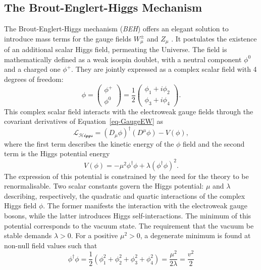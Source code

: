 \subsection{The Brout-Englert-Higgs Mechanism}
The Brout-Englert-Higgs mechanism (\textit{BEH}) offers an elegant solution to introduce mass terms for the gauge fields $W_{\mu}^{\pm}$ and $Z_{\mu}$ \cite{Englert:1964et,  PhysRevLett.13.508}. It postulates the existence of an additional scalar Higgs field, permeating the Universe. The field is mathematically defined as a weak isospin doublet, with a neutral component $\phi^0$ and a charged one $\phi^+$. They are jointly expressed as a complex scalar field with 4 degrees of freedom:
\begin{equation}
\phi = \begin{pmatrix}
    \phi^+\\ 
    \phi^0
\end{pmatrix} = \frac{1}{2} \begin{pmatrix}
    \phi_1 + i\phi_2 \\ 
    \phi_3 + i\phi_4
\end{pmatrix}.
\end{equation}
This complex scalar field interacts with the electroweak gauge fields through the covariant derivatives of Equation~\ref{eq-GaugeEW} as 
\begin{equation}\label{eq-HiggsLag}
    \mathcal{L_{\text{Higgs}}} = (D_{\mu}\phi)^{\dagger} (D^{\mu}\phi) - V(\phi),
 \end{equation}
where the first term describes the kinetic energy of the $\phi$ field and the second term is the Higgs potential energy
\begin{equation}\label{eq-HiggsPot}
 V(\phi) = - \mu^2  \phi^{\dagger} \phi + \lambda (\phi^{\dagger} \phi)^2.
\end{equation}
The expression of this potential is constrained by the need for the theory to be renormalisable. Two scalar constants govern the Higgs potential: $\mu$ and $\lambda$ describing, respectively, the quadratic and quartic interactions of the complex Higgs field $\phi$. The former manifests the interaction with the electroweak gauge bosons, while the latter introduces Higgs self-interactions. The minimum of this potential corresponds to the vacuum state. The requirement that the vacuum be stable demands $\lambda > 0$. For a positive $\mu^2 > 0$, a degenerate minimum is found at non-null field values such that
\begin{equation}\label{eq-HiggsVacEq}
    \phi^{\dagger} \phi  = \frac{1}{2} (\phi_1^2 + \phi_2^2 + \phi_3^2 + \phi_4^2) = \frac{\mu^2}{2\lambda} = \frac{v^2}{2}
\end{equation}
